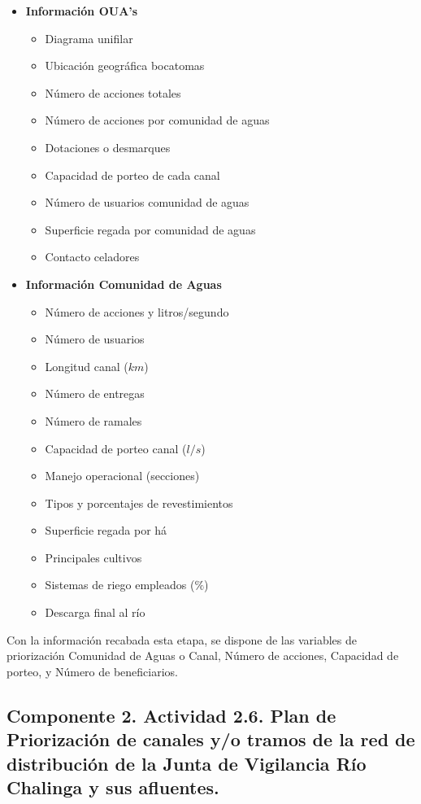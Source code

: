 \documentclass[]{article}
\begin{document}
\begin{itemize}
	\item \textbf{Información OUA's}
	\begin{itemize}	
		\item Diagrama unifilar
		\item Ubicación geográfica bocatomas
		\item Número de acciones totales
		\item Número de acciones por comunidad de aguas
		\item Dotaciones o desmarques
		\item Capacidad de porteo de cada canal
		\item Número de usuarios comunidad de aguas
		\item Superficie regada por comunidad de aguas
		\item Contacto celadores
	\end{itemize}
	\item \textbf{Información Comunidad de Aguas}
	\begin{itemize}	
		\item Número de acciones y litros/segundo
		\item Número de usuarios
		\item Longitud canal ($km$)
		\item Número de entregas
		\item Número de ramales
		\item Capacidad de porteo canal ($l/s$)
		\item Manejo operacional (secciones)
		\item Tipos y porcentajes de revestimientos
		\item Superficie regada por há
		\item Principales cultivos
		\item Sistemas de riego empleados ($\%$)
		\item Descarga final al río
	\end{itemize}
\end{itemize}	

Con la información recabada esta etapa, se dispone de las variables de priorización Comunidad de Aguas o Canal, Número de acciones, Capacidad de porteo, y Número de beneficiarios.
\clearpage
\subsection{Componente 2. Actividad 2.6. Plan de Priorización de canales y/o tramos de la red de distribución de la Junta de Vigilancia Río Chalinga y sus afluentes.}
\end{document}
